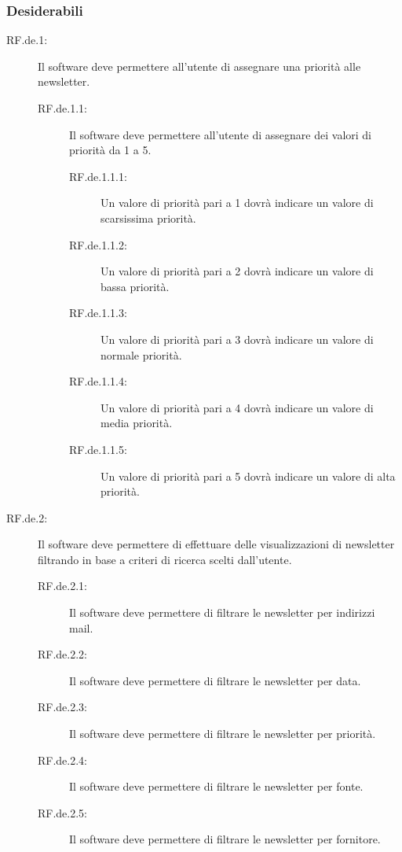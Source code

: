 \subsubsection{Desiderabili}

\begin{description}
\item[RF.de.1:] Il software deve permettere all\textquoteright{}utente di assegnare una priorit\`{a} alle newsletter.
	\begin{description}
	\item[RF.de.1.1:] Il software deve permettere all\textquoteright{}utente di assegnare dei valori di priorit\`{a} da 1 a 5.
		\begin{description}
		\item[RF.de.1.1.1:] Un valore di priorit\`{a} pari a 1 dovr\`{a} indicare un valore di scarsissima priorit\`{a}.
		\item[RF.de.1.1.2:] Un valore di priorit\`{a} pari a 2 dovr\`{a} indicare un valore di bassa priorit\`{a}.
		\item[RF.de.1.1.3:] Un valore di priorit\`{a} pari a 3 dovr\`{a} indicare un valore di normale priorit\`{a}.
		\item[RF.de.1.1.4:] Un valore di priorit\`{a} pari a 4 dovr\`{a} indicare un valore di media priorit\`{a}.
		\item[RF.de.1.1.5:] Un valore di priorit\`{a} pari a 5 dovr\`{a} indicare un valore di alta priorit\`{a}.
		\end{description}
	\end{description}
\item[RF.de.2:] Il software deve permettere di effettuare delle visualizzazioni di newsletter filtrando in base a criteri di ricerca scelti dall\textquoteright{}utente.
	\begin{description}
	\item[RF.de.2.1:] Il software deve permettere di filtrare le newsletter per indirizzi mail.
	\item[RF.de.2.2:] Il software deve permettere di filtrare le newsletter per data.
	\item[RF.de.2.3:] Il software deve permettere di filtrare le newsletter per priorit\`{a}.
	\item[RF.de.2.4:] Il software deve permettere di filtrare le newsletter per fonte.
	\item[RF.de.2.5:] Il software deve permettere di filtrare le newsletter per fornitore.
	\end{description}
\end{description}